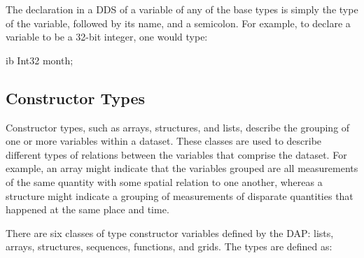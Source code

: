 The declaration in a DDS of a variable of any of the base types is simply the type
of the variable, followed by its name, and a semicolon.  For example, to declare
a  variable to be a 32-bit integer, one would type:

\begin{vcode}{ib}
Int32 month;
\end{vcode}
  

\subsection{Constructor Types}

Constructor types, such as arrays, structures, and lists, describe the
grouping of one or more variables within a dataset. These classes are
used to describe different types of relations between the variables
that comprise the dataset. For example, an array might indicate that
the variables grouped are all measurements of the same quantity with
some spatial relation to one another, whereas a structure might
indicate a grouping of measurements of disparate quantities that
happened at the same place and time. 

There are six classes of type constructor variables defined by the
\opendap DAP: lists, arrays, structures, sequences, functions, and grids. 
The types are defined as:

